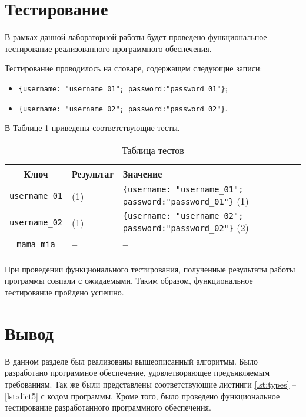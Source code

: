 \clearpage


\section{Тестирование}

В рамках данной лабораторной работы будет проведено функциональное тестирование реализованного программного обеспечения.

Тестирование проводилось на словаре, содержащем следующие записи:
\begin{itemize}
    \item \texttt{\{username: "username\_01"; password:"password\_01"\}};
    \item \texttt{\{username: "username\_02"; password:"password\_02"\}}.
\end{itemize}

В Таблице \ref{tbl:tests} приведены соответствующие тесты.

\begin{table}[ht]
	\small
	\begin{center}
		\caption{Таблица тестов}
		\label{tbl:tests}
		\begin{tabular}{|c|l|l|}
			\hline
			\bfseries Ключ & \bfseries Результат & \bfseries Значение \\ \hline
			\texttt{username\_01} & (1) & \texttt{\{username: "username\_01"; password:"password\_01"\}} (1) \\\hline
			\texttt{username\_02} & (1) & \texttt{\{username: "username\_02"; password:"password\_02"\}} (2) \\\hline
			\texttt{mama\_mia} & \bfseries -- & \bfseries -- \\\hline
		\end{tabular}
	\end{center}
\end{table}

При проведении функционального тестирования, полученные результаты работы программы совпали с ожидаемыми. Таким образом, функциональное тестирование пройдено успешно.

\section{Вывод}

В данном разделе был реализованы вышеописанный алгоритмы. Было разработано программное обеспечение, удовлетворяющее предъявляемым требованиям. Так же были представлены соответствующие листинги \ref{lst:types} -- \ref{lst:dict5} с кодом программы. Кроме того, было проведено функциональное тестирование разработанного программного обеспечения.